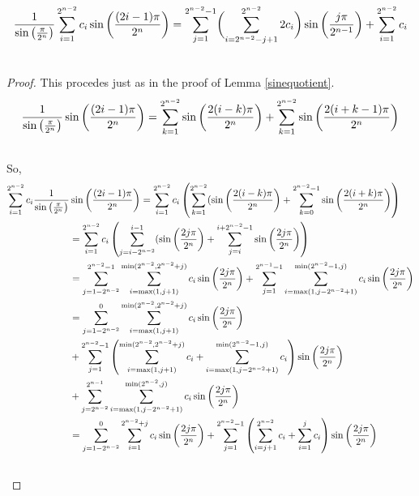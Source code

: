 \documentclass[fleqn,a4paper,9pt]{article}
\begin{document}
\begin{flushleft}
\begin{lemma}\label{oddtoeven}
\begin{align}
\frac{1}{\sin\left(\frac{\pi}{2^{n}}\right) }\sum_{i=1}^{2^{n-2}}c_i\sin\left(\frac{(2i-1)\pi}{2^{n}}\right)&=\sum_{j=1}^{2^{n-2}-1}\biggl(\sum_{i=2^{n-2}-j+1}^{2^{n-2}}2c_i \biggr)\sin\left(\frac{j\pi}{2^{n-1}}\right)+\sum_{i=1}^{2^{n-2}}c_i\\\notag
\end{align}
\end{lemma}
\begin{proof}
This procedes just as in the proof of Lemma \ref{sinequotient}.
\begin{align}
\frac{1}{\sin\left(\frac{\pi}{2^n}\right) }\sin\left(\frac{(2i-1)\pi}{2^n}\right)&=\sum_{k=1}^{2^{n-2}}\sin\left(\frac{2(i-k)\pi}{2^n}\right)+\sum_{k=1}^{2^{n-2}}\sin\left(\frac{2(i+k-1)\pi}{2^n}\right)\\\notag
\end{align}
So,
\begin{align}
\sum_{i=1}^{2^{n-2}}c_i\frac{1}{\sin\left(\frac{\pi}{2^n}\right) }&\sin\left(\frac{(2i-1)\pi}{2^n}\right)=\sum_{i=1}^{2^{n-2}}c_i\left(\sum_{k=1}^{2^{n-2}}(\sin\left(\frac{2(i-k)\pi}{2^n}\right)+\sum_{k=0}^{2^{n-2}-1}\sin\left(\frac{2(i+k)\pi}{2^n}\right)\right)\\\notag
&=\sum_{i=1}^{2^{n-2}}c_i\left(\sum_{j=i-2^{n-2}}^{i-1}(\sin\left(\frac{2j\pi}{2^n}\right)+\sum_{j=i}^{i+2^{n-2}-1}\sin\left(\frac{2j\pi}{2^n}\right)\right)\\\notag
&=\sum_{j=1-2^{n-2}}^{2^{n-2}-1}  \sum_{i=\max(1,j+1)}^{\min(2^{n-2},2^{n-2}+j)}c_i\sin\left(\frac{2j\pi}{2^n}\right)+\sum_{j=1}^{2^{n-1}-1}\sum_{i=\max(1,j-2^{n-2}+1)}^{\min(2^{n-2}-1,j)}c_i\sin\left(\frac{2j\pi}{2^n}\right)\\\notag
&=\sum_{j=1-2^{n-2}}^{0}  \sum_{i=\max(1,j+1)}^{\min(2^{n-2},2^{n-2}+j)}c_i\sin\left(\frac{2j\pi}{2^n}\right)\\\notag
&+\sum_{j=1}^{2^{n-2}-1}\left(\sum_{i=\max(1,j+1)}^{\min(2^{n-2},2^{n-2}+j)}c_i+\sum_{i=\max(1,j-2^{n-2}+1)}^{\min(2^{n-2}-1,j)}c_i\right)\sin\left(\frac{2j\pi}{2^n}\right)\\\notag
&+\sum_{j=2^{n-2}}^{2^{n-1}}\sum_{i=\max(1,j-2^{n-2}+1)}^{\min(2^{n-2},j)}c_i\sin\left(\frac{2j\pi}{2^n}\right)\\\notag
&=\sum_{j=1-2^{n-2}}^{0}  \sum_{i=1}^{2^{n-2}+j}c_i\sin\left(\frac{2j\pi}{2^n}\right)+\sum_{j=1}^{2^{n-2}-1}\left(\sum_{i=j+1}^{2^{n-2}}c_i+\sum_{i=1}^{j}c_i\right)\sin\left(\frac{2j\pi}{2^n}\right)\\\notag

\end{align}
\end{proof}
\end{flushleft}
\end{document}
